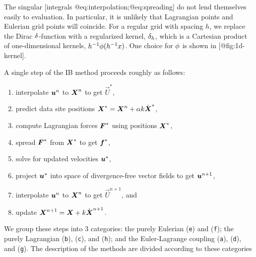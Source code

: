 The singular [integrals @eq:interpolation;@eq:spreading] do not lend themselves
easily to evaluation. In particular, it is unlikely that Lagrangian points and
Eulerian grid points will coincide. For a regular grid with spacing $h$, we
replace the Dirac $\delta$-function with a regularized kernel, $\delta_h$,
which is a Cartesian product of one-dimensional kernels,
$h^{-1}\phi(h^{-1}x)$. One choice for $\phi$ is shown in
[@fig:1d-kernel]. 

A single step of the IB method proceeds roughly as follows:
\begin{enumerate}[label=(\texttt{\alph*})]
    \item interpolate $\boldsymbol{u}^n$ to $\boldsymbol{X}^n$ to get $\vec{U}^\ast$,
    \item predict data site positions $\boldsymbol{X}^\ast = \boldsymbol{X}^n + \alpha k\dot{\boldsymbol{X}}^\ast$,
    \item compute Lagrangian forces $\boldsymbol{F}^\ast$ using positions $\boldsymbol{X}^\ast$,
    \item spread $\boldsymbol{F}^\ast$ from $\boldsymbol{X}^\ast$ to get $\boldsymbol{f}^\ast$,
    \item solve for updated velocities $\boldsymbol{u}^\ast$,
    \item project $\boldsymbol{u}^\ast$ into space of divergence-free vector fields to
        get $\boldsymbol{u}^{n+1}$,
    \item interpolate $\boldsymbol{u}^{n}$ to $\boldsymbol{X}^n$ to get $\vec{U}^{n+1}$, and
    \item update $\boldsymbol{X}^{n+1} = \boldsymbol{X} + k \dot{\boldsymbol{X}}^{n+1}$.
\end{enumerate}
We group these steps into 3 categories: the purely Eulerian
(\texttt{e}) and (\texttt{f}); the purely Lagrangian (\texttt{b}), (\texttt{c}),
and (\texttt{h}); and the Euler-Lagrange coupling (\texttt{a}), (\texttt{d}),
and (\texttt{g}). The description of the methods are divided according to these
categories
